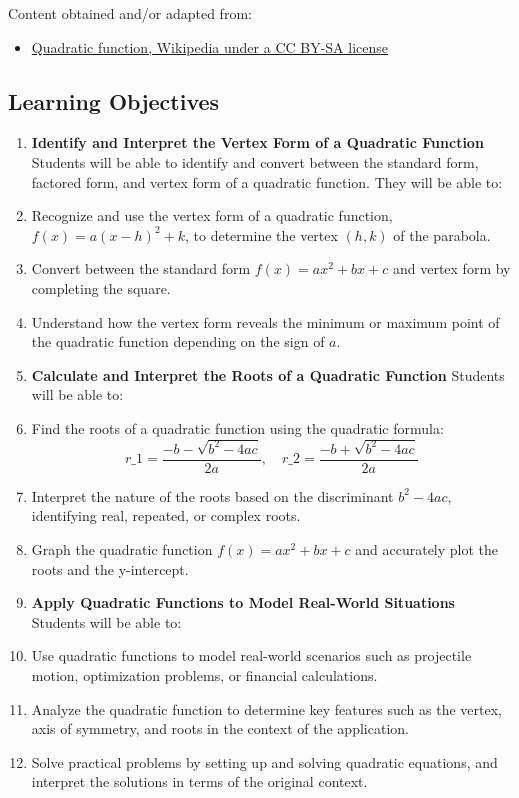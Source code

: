 Content obtained and/or adapted from:

\begin{itemize}
    \item \href{https://en.wikipedia.org/wiki/Quadratic_function}{Quadratic function, Wikipedia under a CC BY-SA license}
\end{itemize}

\subsection{Learning Objectives}

\begin{enumerate}
    \item \textbf{Identify and Interpret the Vertex Form of a Quadratic Function} Students will be able to identify and convert between the standard form, factored form, and vertex form of a quadratic function. They will be able to:
    \item Recognize and use the vertex form of a quadratic function, $f(x) = a(x - h)^2 + k$, to determine the vertex $(h, k)$ of the parabola.
    \item Convert between the standard form $f(x) = ax^2 + bx + c$ and vertex form by completing the square.
    \item Understand how the vertex form reveals the minimum or maximum point of the quadratic function depending on the sign of $a$.
    \item \textbf{Calculate and Interpret the Roots of a Quadratic Function} Students will be able to:
    \item Find the roots of a quadratic function using the quadratic formula: $$ r\_1 = \frac{-b - \sqrt{b^2 - 4ac}}{2a}, \quad r\_2 = \frac{-b + \sqrt{b^2 - 4ac}}{2a} $$
    \item Interpret the nature of the roots based on the discriminant $b^2 - 4ac$, identifying real, repeated, or complex roots.
    \item Graph the quadratic function $f(x) = ax^2 + bx + c$ and accurately plot the roots and the y-intercept.
    \item \textbf{Apply Quadratic Functions to Model Real-World Situations} Students will be able to:
    \item Use quadratic functions to model real-world scenarios such as projectile motion, optimization problems, or financial calculations.
    \item Analyze the quadratic function to determine key features such as the vertex, axis of symmetry, and roots in the context of the application.
    \item Solve practical problems by setting up and solving quadratic equations, and interpret the solutions in terms of the original context.
\end{enumerate}

